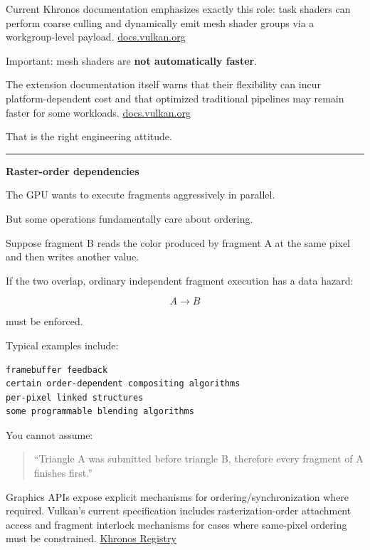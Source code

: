 Current Khronos documentation emphasizes exactly this role: task shaders can perform coarse culling and dynamically emit mesh shader groups via a workgroup-level payload. \href{https://docs.vulkan.org/features/latest/features/proposals/VK_EXT_mesh_shader.html?utm_source=chatgpt.com}{docs.vulkan.org}

Important: mesh shaders are \textbf{not automatically faster}.

The extension documentation itself warns that their flexibility can incur platform-dependent cost and that optimized traditional pipelines may remain faster for some workloads. \href{https://docs.vulkan.org/features/latest/features/proposals/VK_EXT_mesh_shader.html?utm_source=chatgpt.com}{docs.vulkan.org}

That is the right engineering attitude.

\begin{center}\rule{0.5\linewidth}{0.5pt}\end{center}

\textbf{Raster-order dependencies}

The GPU wants to execute fragments aggressively in parallel.

But some operations fundamentally care about ordering.

Suppose fragment B reads the color produced by fragment A at the same pixel and then writes another value.

If the two overlap, ordinary independent fragment execution has a data hazard:

\[
A\rightarrow B
\]

must be enforced.

Typical examples include:

\begin{verbatim}
framebuffer feedback
certain order-dependent compositing algorithms
per-pixel linked structures
some programmable blending algorithms
\end{verbatim}

You cannot assume:

\begin{quote}
``Triangle A was submitted before triangle B, therefore every fragment of A finishes first.''
\end{quote}

Graphics APIs expose explicit mechanisms for ordering/synchronization where required. Vulkan's current specification includes rasterization-order attachment access and fragment interlock mechanisms for cases where same-pixel ordering must be constrained. \href{https://registry.khronos.org/vulkan/specs/latest/pdf/vkspec.pdf?utm_source=chatgpt.com}{Khronos Registry}

